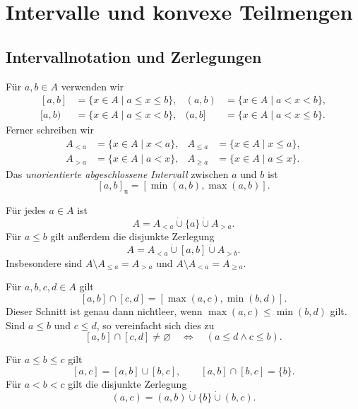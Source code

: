 \chapter{Intervalle und konvexe Teilmengen}
\label{b15guide:ch:intervals}

\section{Intervallnotation und Zerlegungen}

\begin{definition}
\label{b15guide:def:intervals}
Für $a,b\in A$ verwenden wir
\[
\begin{aligned}
 [a,b]&=\{x\in A\mid a\leq x\leq b\},&
 (a,b)&=\{x\in A\mid a<x<b\},\\
 [a,b)&=\{x\in A\mid a\leq x<b\},&
 (a,b]&=\{x\in A\mid a<x\leq b\}.
\end{aligned}
\]
Ferner schreiben wir
\[
\begin{aligned}
 A_{<a}&=\{x\in A\mid x<a\},&
 A_{\leq a}&=\{x\in A\mid x\leq a\},\\
 A_{>a}&=\{x\in A\mid a<x\},&
 A_{\geq a}&=\{x\in A\mid a\leq x\}.
\end{aligned}
\]
Das \emph{unorientierte abgeschlossene Intervall} zwischen
$a$ und $b$ ist
\[
 [a,b]_{\mathrm u}=[\min(a,b),\max(a,b)].
\]
\end{definition}

\begin{theorem}
\label{b15guide:thm:partitions}
Für jedes $a\in A$ ist
\[
 A=A_{<a}\mathbin{\dot\cup}\{a\}\mathbin{\dot\cup}A_{>a}.
\]
Für $a\leq b$ gilt außerdem die disjunkte Zerlegung
\[
 A=A_{<a}\mathbin{\dot\cup}[a,b]\mathbin{\dot\cup}A_{>b}.
\]
Insbesondere sind $A\setminus A_{\leq a}=A_{>a}$
und $A\setminus A_{<a}=A_{\geq a}$.
\end{theorem}

\begin{theorem}
\label{b15guide:thm:interval-intersection}
Für $a,b,c,d\in A$ gilt
\[
 [a,b]\cap[c,d]=[\max(a,c),\min(b,d)].
\]
Dieser Schnitt ist genau dann nichtleer, wenn
$\max(a,c)\leq\min(b,d)$ gilt.
Sind $a\leq b$ und $c\leq d$, so vereinfacht sich dies zu
\[
 [a,b]\cap[c,d]\ne\varnothing
 \quad\Longleftrightarrow\quad(a\leq d\land c\leq b).
\]
\end{theorem}

\begin{theorem}
\label{b15guide:thm:interval-split}
Für $a\leq b\leq c$ gilt
\[
 [a,c]=[a,b]\cup[b,c],\qquad [a,b]\cap[b,c]=\{b\}.
\]
Für $a<b<c$ gilt die disjunkte Zerlegung
\[
 (a,c)=(a,b)\mathbin{\dot\cup}\{b\}\mathbin{\dot\cup}(b,c).
\]
\end{theorem}

